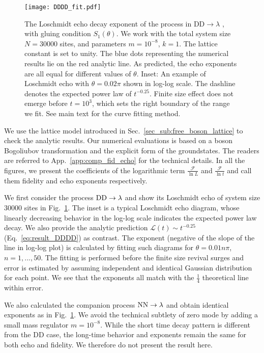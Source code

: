 \begin{figure}[h]
\texttt{[image: DDDD\_fit.pdf]}
\caption{The Loschmidt echo decay exponent of the process in $\text{DD}\rightarrow \lambda$ {\iffalse \color{red}Eq.~\eqref{eq:DDDD}\fi}, with gluing condition $S_1(\theta)$. We work with the total system size $N = 30000$ sites, and parameters $m = 10^{-8}$, $k = 1$. The lattice constant is set to unity. The blue dots representing the numerical results lie on the red analytic line. As predicted, the echo exponents are all equal for different values of $\theta$. Inset: An example of Loschmidt echo with $\theta = 0.02 \pi$ shown in log-log scale. The dashline denotes the expected power law of $t^{-0.25}$. Finite size effect does not emerge before $t=10^{3}$, which sets the right boundary of the range we fit. See main text for the curve fitting method.}
\label{fig:DDDD}
\end{figure}

We use the lattice model introduced in Sec.~\ref{sec_sub:free_boson_lattice} to check the analytic results. Our numerical evaluations is based on a boson Bogoliubov transformation and the explicit form of the groundstates. The readers are referred to App.~\ref{app:comp_fid_echo} for the technical details. In all the figures, we present the coefficients of the logarithmic term $\frac{\mathcal{F}}{\ln L}$ and $\frac{\mathcal{F} }{\ln t}$ and call them fidelity and echo exponents respectively. 

We first consider the process ${\rm DD} \rightarrow \lambda$
and show its Loschmidt echo of system size 30000 sites in Fig.~\ref{fig:DDDD}. The inset is a typical Loschmidt echo diagram, whose linearly decreasing behavior in the log-log scale indicates the expected power law decay. We also provide the analytic prediction $\mathcal{L}(t)\sim t^{-0.25}$ (\cf Eq.~\eqref{eq:result_DDDD}) as contrast. The exponent (negative of the slope of the line in log-log plot) is calculated by fitting such diagrams for $\theta = 0.01n \pi$, $n = 1,...,50 $. The fitting is performed before the finite size revival surges and error is estimated by assuming independent and identical Gaussian distribution for each point. We see that the exponents all match with the $\frac{1}{4}$ theoretical line within error. 

We also calculated the companion process ${\rm NN} \rightarrow \lambda$ and obtain identical exponents as in Fig.~\ref{fig:DDDD}. We avoid the technical subtlety of zero mode by adding a small mass regulator $m=10^{-8}$. While the short time decay pattern is different from the DD case, the long-time behavior and exponents remain the same for both echo and fidelity. We therefore do not present the result here. 

